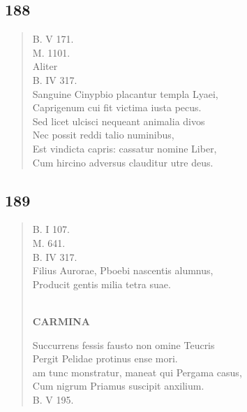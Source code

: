 \documentclass[11pt, a4paper]{report}
\begin{document}
            \subsection*{188}
      \begin{verse}
      B. V 171. \\ M. 1101. \\ Aliter \\ B. IV 317. \\ Sanguine Cinypbio placantur templa Lyaei, \\ Caprigenum cui fit victima iusta pecus. \\ Sed licet ulcisci nequeant animalia divos \\ Nec possit reddi talio numinibus, \\ Est vindicta capris: cassatur nomine Liber, \\ Cum hircino adversus clauditur utre deus. \\ 
      \end{verse}
  
            \subsection*{189}
      \begin{verse}
      B. I 107. \\ M. 641. \\ B. IV 317. \\ Filius Aurorae, Pboebi nascentis alumnus, \\ Producit gentis milia tetra suae. \\ 
        ﻿\pagebreak 
     \marginpar{[158]} \begin{center} \textbf{CARMINA} \end{center}Succurrens fessis fausto non omine Teucris \\ Pergit Pelidae protinus ense mori. \\ am tunc monstratur, maneat qui Pergama casus, \\ Cum nigrum Priamus suscipit anxilium. \\ B. V 195. \\ 
      \end{verse}
  
\end{document}
